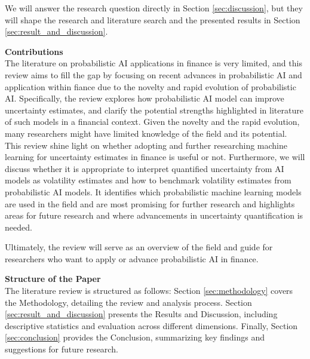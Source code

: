 We will answer the research question directly in Section \ref{sec:discussion}, but they will shape the research and literature search and the presented results in Section \ref{sec:result_and_discussion}. 

 
\textbf{Contributions}\\
The literature on probabilistic AI applications in finance is very limited, and this review aims to fill the gap by focusing on recent advances in probabilistic AI and application within fiance due to the novelty and rapid evolution of probabilistic AI. Specifically, the review explores how probabilistic AI model can improve uncertainty estimates, and clarify the potential strengths highlighted in literature of such models in a financial context. Given the novelty and the rapid evolution, many researchers might have limited knowledge of the field and its potential. This review shine light on whether adopting and further researching machine learning for uncertainty estimates in finance is useful or not. Furthermore, we will discuss whether it is appropriate to interpret quantified uncertainty from AI models as volatility estimates and how to benchmark volatility estimates from probabilistic AI models. It identifies which probabilistic machine learning models are used in the field and are most promising for further research and highlights areas for future research and where advancements in uncertainty quantification is needed. 

Ultimately, the review will serve as an overview of the field and guide for researchers who want to apply or advance probabilistic AI in finance. 


\textbf{Structure of the Paper}\\
The literature review is structured as follows: Section \ref{sec:methodology} covers the Methodology, detailing the review and analysis process. Section \ref{sec:result_and_discussion} presents the Results and Discussion, including descriptive statistics and evaluation across different dimensions. Finally, Section \ref{sec:conclusion} provides the Conclusion, summarizing key findings and suggestions for future research. 